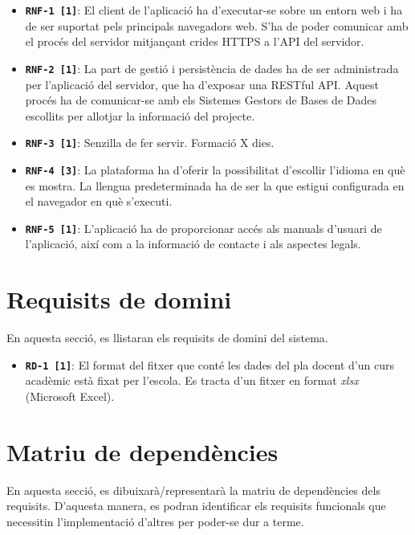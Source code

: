 \documentclass[a4paper,12pt]{ThesisStyle}
\begin{document}
\begin{itemize}
  \item \texttt{\textbf{RNF-1 [1]}}: El client de l'aplicació ha d'executar-se sobre un entorn web i ha de ser suportat pels principals navegadors web. S'ha de poder comunicar amb el procés del servidor mitjançant crides HTTPS a l'API del servidor.
  \item \texttt{\textbf{RNF-2 [1]}}: La part de gestió i persistència de dades ha de ser administrada per l'aplicació del servidor, que ha d'exposar una RESTful API. Aquest procés ha de comunicar-se amb els Sistemes Gestors de Bases de Dades escollits per allotjar la informació del projecte.

  \item \texttt{\textbf{RNF-3 [1]}}: Senzilla de fer servir. Formació X dies.
  \item \texttt{\textbf{RNF-4 [3]}}: La plataforma ha d'oferir la possibilitat d'escollir l'idioma en què es mostra. La llengua predeterminada ha de ser la que estigui configurada en el navegador en què s'executi.
  \item \texttt{\textbf{RNF-5 [1]}}: L'aplicació ha de proporcionar accés als manuals d'usuari de l'aplicació, així com a la informació de contacte i als aspectes legals.
\end{itemize}

\section{Requisits de domini}
\label{sec:requisits_domini}

En aquesta secció, es llistaran els requisits de domini del sistema.

\begin{itemize}
  \item \texttt{\textbf{RD-1 [1]}}: El format del fitxer que conté les dades del pla docent d'un curs acadèmic està fixat per l'escola. Es tracta d'un fitxer en format \emph{xlsx} (Microsoft Excel).
\end{itemize}

\section{Matriu de dependències}
\label{sec:matriu_dependencies}

En aquesta secció, es dibuixarà/representarà la matriu de dependències dels requisits. D'aquesta manera, es podran identificar els requisits funcionals que necessitin l'implementació d'altres per poder-se dur a terme.
\end{document}
